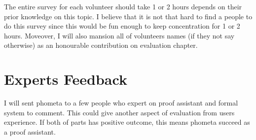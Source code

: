 The entire survey for each volunteer should take 1 or 2 hours depends on their prior knowledge on this topic. I believe that it is not that hard to find a people to do this survey since this would be fun enough to keep concentration for 1 or 2 hours. Moveover, I will also mansion all of volunteers names (if they not say otherwise) as an honourable contribution on evaluation chapter.

\section{Experts Feedback}

I will sent phometa to a few people who expert on proof assistant and formal system to comment. This could give another aspect of evaluation from users experience. If both of parts has positive outcome, this means phometa succeed as a proof assistant.
